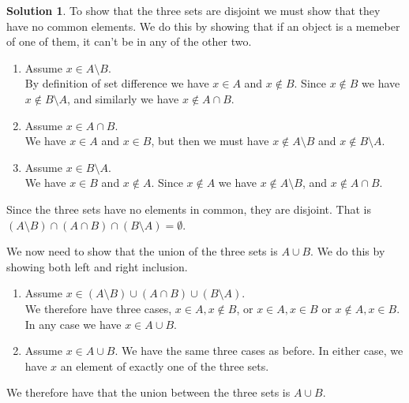 \documentclass[a4paper, twocolumn]{report}
\theoremstyle{definition}
\theoremstyle{solution}
\newtheorem*{sltn}{Solution}
\newcommand{\union}{\cup}
\newcommand{\intrsct}{\cap}
\begin{document}
\begin{sltn}
  To show that the three sets are disjoint we must show that they have no common elements.
  We do this by showing that if an object is a memeber of one of them, it can't be in any of the other two.
  \begin{enumerate}
    \item Assume $x \in A \setminus B$. \\
      [0.2cm]
      By definition of set difference we have $x \in A$ and $x \notin B$.
      Since $x \notin B$ we have $x \notin B \setminus A$, and similarly we
      have $x \notin A \intrsct B$.

    \item Assume $x \in A \intrsct B$. \\
      [0.2cm]
      We have $x \in A$ and $x \in B$, but then we must have $x \notin A
      \setminus B$ and $x \notin B \setminus A$. 

    \item Assume $x \in B \setminus A$. \\
      [0.2cm]
      We have $x \in B$ and $x \notin A$. Since $x \notin A$ we have $x \notin
      A \setminus B$, and $x \notin A \intrsct B$.
  \end{enumerate}

  Since the three sets have no elements in common, they are disjoint. That is
  $\left( A \setminus B \right) \intrsct \left( A \intrsct B \right) \intrsct
  \left( B\setminus A \right) = \emptyset$.

  We now need to show that the union of the three sets is $A \union B$.
  We do this by showing both left and right inclusion.

  \begin{enumerate}
    \item Assume $x \in (A \setminus B)\union (A\intrsct B) \union (B\setminus A)$.\\
      [0.2cm]
      We therefore have three cases, $x \in A, x \notin B$, or $x \in A, x \in
      B$ or $x \notin A, x \in B$. In any case we have $x \in A \union B$.

    \item Assume $x \in A \union B$.
      We have the same three cases as before. In either case, we have $x$ an
      element of exactly one of the three sets.
  \end{enumerate}

  We therefore have that the union between the three sets is $A \union B$.
\end{sltn}

\todos
\end{document}

